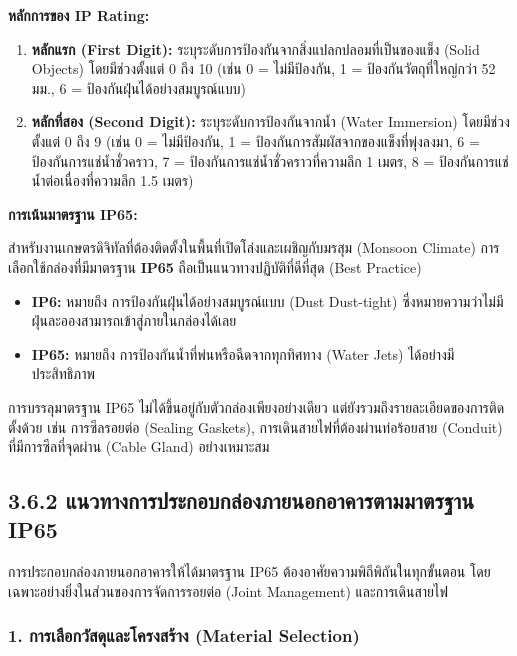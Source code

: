 \documentclass[11pt,a4paper,openany]{report}
\begin{document}
\textbf{หลักการของ IP Rating:}

\begin{enumerate}
  \item \textbf{หลักแรก (First Digit):} ระบุระดับการป้องกันจากสิ่งแปลกปลอมที่เป็นของแข็ง (Solid Objects) โดยมีช่วงตั้งแต่ 0 ถึง 10 (เช่น 0 = ไม่มีป้องกัน, 1 = ป้องกันวัตถุที่ใหญ่กว่า 52 มม., 6 = ป้องกันฝุ่นได้อย่างสมบูรณ์แบบ)
  \item \textbf{หลักที่สอง (Second Digit):} ระบุระดับการป้องกันจากน้ำ (Water Immersion) โดยมีช่วงตั้งแต่ 0 ถึง 9 (เช่น 0 = ไม่มีป้องกัน, 1 = ป้องกันการสัมผัสจากของแข็งที่พุ่งลงมา, 6 = ป้องกันการแช่น้ำชั่วคราว, 7 = ป้องกันการแช่น้ำชั่วคราวที่ความลึก 1 เมตร, 8 = ป้องกันการแช่น้ำต่อเนื่องที่ความลึก 1.5 เมตร)
\end{enumerate}


\textbf{การเน้นมาตรฐาน IP65:}

สำหรับงานเกษตรดิจิทัลที่ต้องติดตั้งในพื้นที่เปิดโล่งและเผชิญกับมรสุม (Monsoon Climate) การเลือกใช้กล่องที่มีมาตรฐาน \textbf{IP65} ถือเป็นแนวทางปฏิบัติที่ดีที่สุด (Best Practice)

\begin{itemize}
  \item \textbf{IP6:} หมายถึง การป้องกันฝุ่นได้อย่างสมบูรณ์แบบ (Dust Dust-tight) ซึ่งหมายความว่าไม่มีฝุ่นละอองสามารถเข้าสู่ภายในกล่องได้เลย
  \item \textbf{IP65:} หมายถึง การป้องกันน้ำที่พ่นหรือฉีดจากทุกทิศทาง (Water Jets) ได้อย่างมีประสิทธิภาพ
\end{itemize}


การบรรลุมาตรฐาน IP65 ไม่ได้ขึ้นอยู่กับตัวกล่องเพียงอย่างเดียว แต่ยังรวมถึงรายละเอียดของการติดตั้งด้วย เช่น การซีลรอยต่อ (Sealing Gaskets), การเดินสายไฟที่ต้องผ่านท่อร้อยสาย (Conduit) ที่มีการซีลที่จุดผ่าน (Cable Gland) อย่างเหมาะสม

\subsection{3.6.2 แนวทางการประกอบกล่องภายนอกอาคารตามมาตรฐาน IP65}


การประกอบกล่องภายนอกอาคารให้ได้มาตรฐาน IP65 ต้องอาศัยความพิถีพิถันในทุกขั้นตอน โดยเฉพาะอย่างยิ่งในส่วนของการจัดการรอยต่อ (Joint Management) และการเดินสายไฟ

\subsubsection{1. การเลือกวัสดุและโครงสร้าง (Material Selection)}
\end{document}

